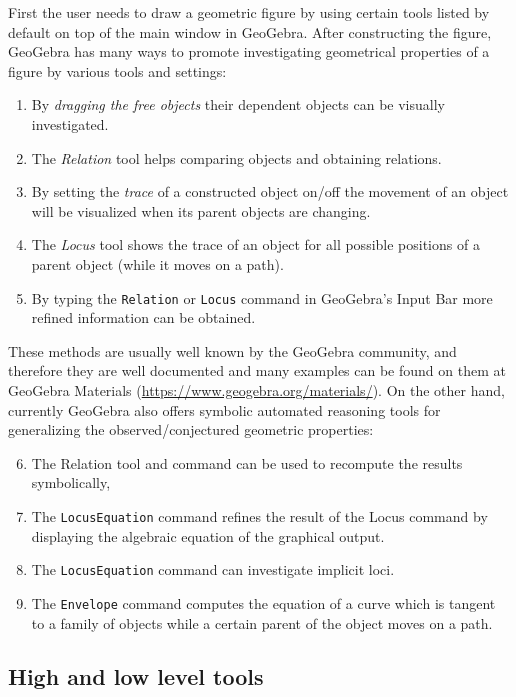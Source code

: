 \documentclass{article}
\begin{document}
First the user needs to draw a geometric figure by using certain tools listed by default on top of the main window in GeoGebra. After constructing the figure, GeoGebra has many ways to promote investigating geometrical properties of a figure by various tools and settings:
\begin{enumerate}
    \item By \textit{dragging the free objects} their dependent objects can be visually investigated.
    \item The \textit{Relation} tool helps comparing objects and obtaining relations.
    \item By setting the \textit{trace} of a constructed object on/off the movement of an object will be visualized when its parent objects are changing.
    \item The \textit{Locus} tool shows the trace of an object for all possible positions of a parent object (while it moves on a path).
    \item By typing the \texttt{Relation} or \texttt{Locus} command in GeoGebra's Input Bar more refined information can be obtained.
\end{enumerate}
These methods are usually well known by the GeoGebra community, and therefore they are well documented and many examples can be found on them at GeoGebra Materials (\url{https://www.geogebra.org/materials/}). On the other hand, currently GeoGebra also offers symbolic automated reasoning tools for generalizing the observed/conjectured geometric properties:
\begin{enumerate}
\setcounter{enumi}{5}
    \item The Relation tool and command can be used to recompute the results symbolically,
    \item The \texttt{LocusEquation} command refines the result of the Locus command by displaying the algebraic equation of the graphical output.
    \item The \texttt{LocusEquation} command can investigate implicit loci.
    \item The \texttt{Envelope} command computes the equation of a curve which is tangent to a family of objects while a certain parent of the object moves on a path.
\end{enumerate}

\subsection{High and low level tools}
\end{document}
